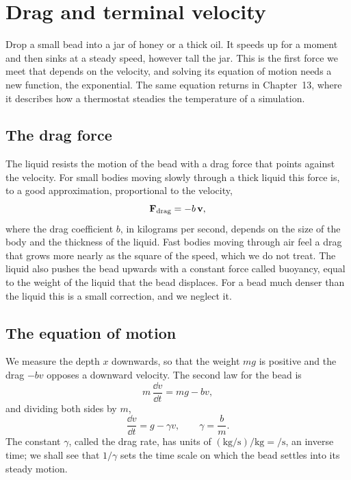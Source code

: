\section{Drag and terminal velocity}
\label{sec:ne-drag}

Drop a small bead into a jar of honey or a thick oil. It speeds up for a
moment and then sinks at a steady speed, however tall the jar. This is
the first force we meet that depends on the velocity, and solving its
equation of motion needs a new function, the exponential. The same
equation returns in Chapter~13, where it describes how a thermostat
steadies the temperature of a simulation.

\subsection*{The drag force}

The liquid resists the motion of the bead with a drag force that points
against the velocity. For small bodies moving slowly through a thick
liquid this force is, to a good approximation, proportional to the
velocity,
\begin{equation*}
   \bm{\mathrm{F}}_{\mathrm{drag}} = -b\,\bm{\mathrm{v}} ,
\end{equation*}
where the drag coefficient $b$, in kilograms per second, depends on the
size of the body and the thickness of the liquid. Fast bodies moving
through air feel a drag that grows more nearly as the square of the
speed, which we do not treat. The liquid also pushes the bead upwards
with a constant force called buoyancy, equal to the weight of the liquid
that the bead displaces. For a bead much denser than the liquid this is
a small correction, and we neglect it.

\subsection*{The equation of motion}

We measure the depth $x$ downwards, so that the weight $mg$ is positive
and the drag $-bv$ opposes a downward velocity. The second law for the
bead is
\begin{equation*}
   m\,\frac{\dd v}{\dd t} = mg - bv ,
\end{equation*}
and dividing both sides by $m$,
\begin{equation}
   \frac{\dd v}{\dd t} = g - \gamma v, \qquad \gamma = \frac{b}{m} .
   \label{eq:ne-drag}
\end{equation}
The constant $\gamma$, called the drag rate, has units of
$(\si{\kilogram\per\second})/\si{\kilogram} = \si{\per\second}$, an
inverse time; we shall see that $1/\gamma$ sets the time scale on which the
bead settles into its steady motion.

